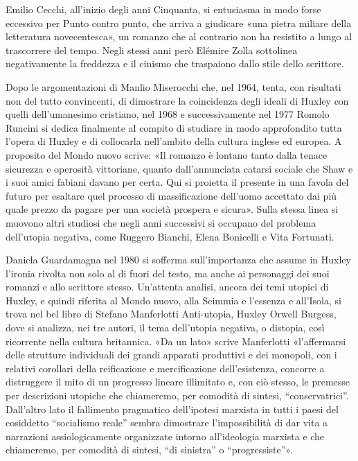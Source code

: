 \documentclass[
a5paper, %
10pt, %
twoside, 
onecolumn, %
openany, %
]{memoir}
\begin{document}
Emilio Cecchi, all’inizio degli anni Cinquanta, si entusiasma in modo forse eccessivo per Punto contro punto, che arriva a giudicare «una pietra miliare della letteratura novecentesca», un romanzo che al contrario non ha resistito a lungo al trascorrere del tempo. Negli stessi anni però Elémire Zolla sottolinea negativamente la freddezza e il cinismo che traspaiono dallo stile dello scrittore.

Dopo le argomentazioni di Manlio Miserocchi che, nel 1964, tenta, con risultati non del tutto convincenti, di dimostrare la coincidenza degli ideali di Huxley con quelli dell’umanesimo cristiano, nel 1968 e successivamente nel 1977 Romolo Runcini si dedica finalmente al compito di studiare in modo approfondito tutta l’opera di Huxley e di collocarla nell’ambito della cultura inglese ed europea. A proposito del Mondo nuovo scrive: «Il romanzo è lontano tanto dalla tenace sicurezza e operosità vittoriane, quanto dall’annunciata catarsi sociale che Shaw e i suoi amici fabiani davano per certa. Qui si proietta il presente in una favola del futuro per esaltare quel processo di massificazione dell’uomo accettato dai più quale prezzo da pagare per una società prospera e sicura». Sulla stessa linea si muovono altri studiosi che negli anni successivi si occupano del problema dell’utopia negativa, come Ruggero Bianchi, Elena Bonicelli e Vita Fortunati.

Daniela Guardamagna nel 1980 si sofferma sull’importanza che assume in Huxley l’ironia rivolta non solo al di fuori del testo, ma anche ai personaggi dei suoi romanzi e allo scrittore stesso. Un’attenta analisi, ancora dei temi utopici di Huxley, e quindi riferita al Mondo nuovo, alla Scimmia e l’essenza e all’Isola, si trova nel bel libro di Stefano Manferlotti Anti-utopia, Huxley Orwell Burgess, dove si analizza, nei tre autori, il tema dell’utopia negativa, o distopia, così ricorrente nella cultura britannica. «Da un lato» scrive Manferlotti «l’affermarsi delle strutture individuali dei grandi apparati produttivi e dei monopoli, con i relativi corollari della reificazione e mercificazione dell’esistenza, concorre a distruggere il mito di un progresso lineare illimitato e, con ciò stesso, le premesse per descrizioni utopiche che chiameremo, per comodità di sintesi, “conservatrici”. Dall’altro lato il fallimento pragmatico dell’ipotesi marxista in tutti i paesi del cosiddetto “socialismo reale” sembra dimostrare l’impossibilità di dar vita a narrazioni assiologicamente organizzate intorno all’ideologia marxista e che chiameremo, per comodità di sintesi, “di sinistra” o “progressiste”».
\end{document}
